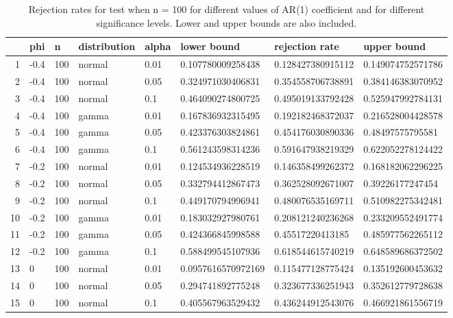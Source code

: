 \begin{table}[ht]
\centering
\caption{Rejection rates for test when n = 100 for 
                   different values of AR(1) coefficient and for different 
                   significance levels. Lower and upper bounds are also 
                   included.} 
\label{table:rr_100}
\begin{tabular}{rlllllll}
  \hline
 & phi & n & distribution & alpha & lower bound & rejection rate & upper bound \\ 
  \hline
1 & -0.4 & 100 & normal & 0.01 & 0.107780009258438 & 0.128427380915112 & 0.149074752571786 \\ 
  2 & -0.4 & 100 & normal & 0.05 & 0.324971030406831 & 0.354558706738891 & 0.384146383070952 \\ 
  3 & -0.4 & 100 & normal & 0.1 & 0.464090274800725 & 0.495019133792428 & 0.525947992784131 \\ 
  4 & -0.4 & 100 & gamma & 0.01 & 0.167836932315495 & 0.192182468372037 & 0.216528004428578 \\ 
  5 & -0.4 & 100 & gamma & 0.05 & 0.423376303824861 & 0.454176030890336 & 0.48497575795581 \\ 
  6 & -0.4 & 100 & gamma & 0.1 & 0.561243598314236 & 0.591647938219329 & 0.622052278124422 \\ 
  7 & -0.2 & 100 & normal & 0.01 & 0.124534936228519 & 0.146358499262372 & 0.168182062296225 \\ 
  8 & -0.2 & 100 & normal & 0.05 & 0.332794412867473 & 0.362528092671007 & 0.39226177247454 \\ 
  9 & -0.2 & 100 & normal & 0.1 & 0.449170794996941 & 0.480076535169711 & 0.510982275342481 \\ 
  10 & -0.2 & 100 & gamma & 0.01 & 0.183032927980761 & 0.208121240236268 & 0.233209552491774 \\ 
  11 & -0.2 & 100 & gamma & 0.05 & 0.424366845998588 & 0.45517220413185 & 0.485977562265112 \\ 
  12 & -0.2 & 100 & gamma & 0.1 & 0.588499545107936 & 0.618544615740219 & 0.648589686372502 \\ 
  13 & 0 & 100 & normal & 0.01 & 0.0957616570972169 & 0.115477128775424 & 0.135192600453632 \\ 
  14 & 0 & 100 & normal & 0.05 & 0.294741892775248 & 0.323677336251943 & 0.352612779728638 \\ 
  15 & 0 & 100 & normal & 0.1 & 0.405567963529432 & 0.436244912543076 & 0.466921861556719 \\ 

\end{tabular}
\end{table}
